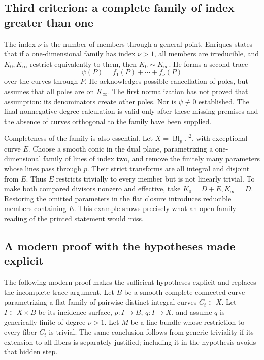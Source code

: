 \subsection{Third criterion: a complete family of index greater than one}

The index \(\nu\) is the number of members through a general point. Enriques states that if a one-dimensional family has index \(\nu>1\), all members are irreducible, and \(K_0,K_\infty\) restrict equivalently to them, then \(K_0\sim K_\infty\). He forms a second trace \[
\psi(P)=f_1(P)+\cdots+f_\nu(P)
\] over the curves through \(P\). He acknowledges possible cancellation of poles, but assumes that all poles are on \(K_\infty\). The first normalization has not proved that assumption: its denominators create other poles. Nor is \(\psi\not\equiv0\) established. The final nonnegative-degree calculation is valid only after these missing premises and the absence of curves orthogonal to the family have been supplied.

Completeness of the family is also essential. Let \(X=\operatorname{Bl}_p\mathbb{P}^2\), with exceptional curve \(E\). Choose a smooth conic in the dual plane, parametrizing a one-dimensional family of lines of index two, and remove the finitely many parameters whose lines pass through \(p\). Their strict transforms are all integral and disjoint from \(E\). Thus \(E\) restricts trivially to every member but is not linearly trivial. To make both compared divisors nonzero and effective, take \(K_0=D+E,K_\infty=D\). Restoring the omitted parameters in the flat closure introduces reducible members containing \(E\). This example shows precisely what an open-family reading of the printed statement would miss.

\subsection{A modern proof with the hypotheses made explicit}

The following modern proof makes the sufficient hypotheses explicit and replaces the incomplete trace argument. Let \(B\) be a smooth complete connected curve parametrizing a flat family of pairwise distinct integral curves \(C_t\subset X\). Let \(I\subset X\times B\) be its incidence surface, \(p:I\to B\), \(q:I\to X\), and assume \(q\) is generically finite of degree \(\nu>1\). Let \(M\) be a line bundle whose restriction to every fiber \(C_t\) is trivial. The same conclusion follows from generic triviality if its extension to all fibers is separately justified; including it in the hypothesis avoids that hidden step.

